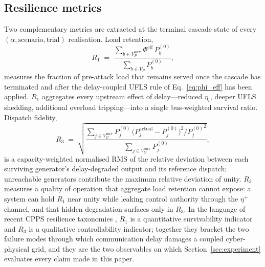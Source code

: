 \subsection{Resilience metrics}\label{sec:metrics}

Two complementary metrics are extracted at the terminal cascade
state of every $(\alpha,\text{scenario},\text{trial})$ realisation.
Load retention,
\begin{equation}\label{eq:R1_v3}
  R_1
  \;=\; \frac{\sum_{b\in V_P^{\text{surv}}}\Phi^{\text{eff}}\,P_b^{(0)}}
             {\sum_{b\in V_P}P_b^{(0)}},
\end{equation}
measures the fraction of pre-attack load that remains served once
the cascade has terminated and after the delay-coupled UFLS rule of
Eq.~\eqref{eq:phi_eff} has been applied.  $R_1$ aggregates every
upstream effect of delay---reduced $\eta_i$, deeper UFLS shedding,
additional overload tripping---into a single bus-weighted survival
ratio.  Dispatch fidelity,
\begin{equation}\label{eq:R3_v3}
  R_3
  \;=\; \sqrt{\frac{\sum_{j\in V_G^{\text{surv}}}P_j^{(0)}\,
            \bigl(P_j^{\text{actual}}-P_j^{(0)}\bigr)^{2}/{P_j^{(0)}}^{2}}
                {\sum_{j\in V_G^{\text{surv}}}P_j^{(0)}}},
\end{equation}
is a capacity-weighted normalised RMS of the relative deviation
between each surviving generator's delay-degraded output and its
reference dispatch; unreachable generators contribute the maximum
relative deviation of unity.  $R_3$ measures a quality of operation
that aggregate load retention cannot expose: a system can hold
$R_1$ near unity while leaking control authority through the
$\eta^{+}$ channel, and that hidden degradation surfaces only in
$R_3$.  In the language of recent CPPS resilience taxonomies
\citep{Panteli2015,Bie2017}, $R_1$ is a quantitative survivability
indicator and $R_3$ is a qualitative controllability indicator;
together they bracket the two failure modes through which
communication delay damages a coupled cyber-physical grid, and
they are the two observables on which Section~\ref{sec:experiment}
evaluates every claim made in this paper.

